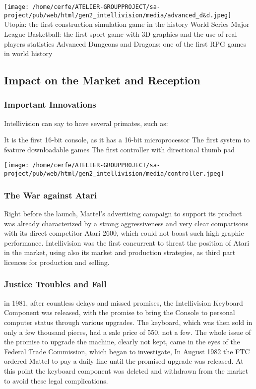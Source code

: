 \documentclass[a4paper,10pt]{book}
\begin{document}
 
 \texttt{[image: /home/cerfe/ATELIER-GROUPPROJECT/sa-project/pub/web/html/gen2\_intellivision/media/advanced\_d\&d.jpeg]}
 Utopia: the first construction simulation game in the history 
 World Series Major League Basketball: the first sport game with 3D graphics and the use of real players statistics 
 Advanced Dungeons and Dragons: one of the first RPG games in world history 
 
 \subsection{Impact on the Market and Reception }
 \subsubsection{Important Innovations }
        Intellivision can say to have several primates, such as:
         
 It is the first 16-bit console, as it has a 16-bit microprocessor 
 The first system to feature downloadable games 
 The first controller with directional thumb pad 
 
 \texttt{[image: /home/cerfe/ATELIER-GROUPPROJECT/sa-project/pub/web/html/gen2\_intellivision/media/controller.jpeg]}
 \subsubsection{The War against Atari }
 
            Right before the launch, Mattel's advertising campaign to support its product was already characterized by a
            strong aggressiveness and very clear comparisons with its direct competitor Atari 2600, which could not boast
            such high graphic performance. Intellivision was the first concurrent to threat the position of Atari in the
            market, using also its market and production strategies, as third part licences for production and selling.
         
 \subsubsection{Justice Troubles and Fall }
 
        in 1981, after countless delays and missed promises, the Intellivision Keyboard Component was released, with the promise
        to bring the Console to personal computer status through various upgrades. The keyboard, which was then
        sold in only a few thousand pieces, had a sale price of 550, not a few.
        The whole issue of the promise to upgrade the machine, clearly not kept, came in the eyes of the Federal Trade
        Commission, which began to investigate, In August 1982 the FTC ordered Mattel to pay a daily fine until the promised
        upgrade was released. At this point the keyboard component was deleted and withdrawn from the market to avoid these
        legal complications.
         
\end{document}
